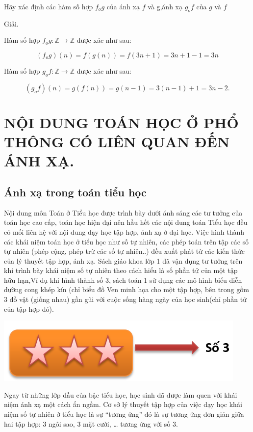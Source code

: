 \documentclass[12pt,oneside,a4paper,reqno]{book}
\begin{document}
Hãy xác định các hàm số hợp $f_o g$ của ánh xạ $f$ và g,ánh xạ $g_o f$ của $g$ và $f$

Giải.

Hàm số hợp $f_o g:\mathbb{Z}\to \mathbb{Z}$  được xác như sau:

$$(f_o g)(n)=f(g(n))=f(3n+1)=3n+1-1=3n$$

 Hàm số hợp $g_o f:\mathbb{Z}\to \mathbb{Z}$  được xác như sau:

$$(g_o f)(n)=g(f(n))=g(n-1)=3(n-1)+1=3n-2.$$



\chapter{NỘI DUNG TOÁN HỌC Ở PHỔ THÔNG CÓ LIÊN QUAN ĐẾN ÁNH XẠ.}
\section{Ánh xạ trong toán tiểu học}
\medskip
    Nội dung môn Toán ở Tiểu học được trình bày dưới ánh sáng các tư tưởng của toán học cao cấp, toán học hiện đại nên hầu hết các nội dung toán Tiểu học đều có mối liên hệ với nội dung dạy học tập hợp, ánh xạ ở đại học. Việc hình thành các khái niệm toán học ở tiểu học như số tự nhiên, các phép toán trên tập các số tự nhiên (phép cộng, phép trừ các số tự nhiên..) đều xuất phát từ các kiến thức của lý thuyết tập hợp, ánh xạ.
\medskip
    Sách giáo khoa lớp 1 đã vận dụng tư tưởng trên khi trình bày khái niệm số tự nhiên theo cách hiểu là số phần tử của một tập hữu hạn,Ví dụ  khi hình thành số 3, sách toán 1 sử dụng các mô hình biểu diễn dường cong khép kín (chỉ biểu đồ Ven minh họa cho một tập hợp, bên trong gồm 3 đồ vật (giống nhau) gần gũi với cuộc sống hàng ngày của học sinh(chỉ phần tử của tập hợp đó).
    
\includegraphics{hinh7}

\medskip
    Ngay từ những lớp đầu của bậc tiểu học, học sinh đã được làm quen với khái niệm ánh xạ một cách ẩn ngầm. Cơ sở lý thuyết tập hợp của việc dạy học khái niệm số tự nhiên ở tiểu học là sự “tương ứng” đó là sự tương ứng đơn giản giữa hai tập hợp: 3 ngôi sao, 3 mặt cười,  … tương ứng với số 3.\\
\end{document}
